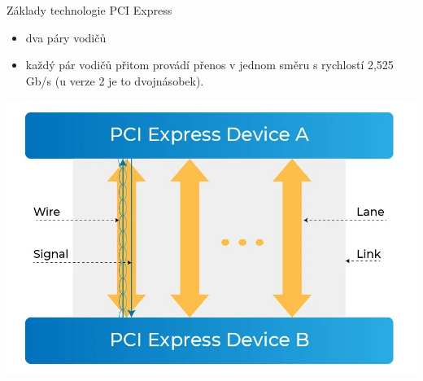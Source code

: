 \documentclass[aspectratio=43]{beamer}
\begin{document}
\begin{frame}{Základy technologie PCI Express}
	\begin{itemize}
		\item dva páry vodičů
		\item každý pár vodičů přitom provádí přenos v jednom směru s rychlostí 2,525 Gb/s (u verze 2 je to dvojnásobek).
	\end{itemize}
	
	\begin{center}
		\includegraphics[width=0.8\linewidth]{extrahovane_obrazky/pci_laL.jpg}
	\end{center}
	
\end{frame}
\end{document}
